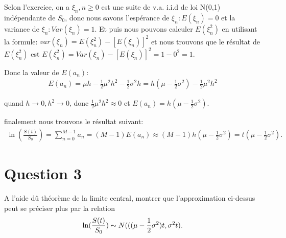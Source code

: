 \documentclass[a4paper,10pt]{report}
\begin{document}
\par Selon l'exercice, on a $\xi_{n}, n \geq 0$ est une suite de v.a. i.i.d de loi N(0,1) indépendante de $S_{0}$, donc nous savons l'espérance de $\xi_{n}: E(\xi_{n}) = 0$ et la variance de $\xi_{n}: Var(\xi_{n}) = 1$.  Et puis nous pouvons calculer $E(\xi_{n}^{2})$ en utilisant la formule: $var(\xi_{n}) = E(\xi_{n}^{2}) - [E(\xi_{n})]^{2}$ et nous trouvons que le résultat de $E(\xi_{n}^{2})$ est $E(\xi_{n}^{2}) = Var(\xi_{n}) - [E(\xi_{n})]^{2} = 1 - 0^{2} = 1$.
\par Donc la valeur de $E(a_{n})$:
\begin{align*}
	E(a_{n}) = \mu h -\frac{1}{2} \mu^{2} h^{2} -\frac{1}{2} \sigma^{2} h = h(\mu - \frac{1}{2} \sigma^{2}) -\frac{1}{2} \mu^{2} h^{2}
\end{align*}
\par quand $h \rightarrow 0, h^{2} \rightarrow 0$, donc $\frac{1}{2} \mu^{2} h^{2} \approx 0$ et $E(a_{n}) = h(\mu - \frac{1}{2} \sigma^{2})$.
\par finalement nous trouvons le résultat suivant:
\begin{align*}
		\ln (\frac{S(t)}{S_{0}}) = \sum_{n=0}^{M-1} a_{n} = (M-1) E(a_{n}) \approx (M - 1) h(\mu - \frac{1}{2} \sigma^{2}) = t(\mu - \frac{1}{2} \sigma^{2}).
\end{align*}

\section{Question 3}
\par A l'aide dû théorème de la limite central, montrer que l'approximation ci-dessus peut se préciser plus par la relation
\begin{align*}
	\ln (\frac{S(t)}{S_{0}}) \thicksim N(((\mu - \frac{1}{2} \sigma^{2})t, \sigma^{2}t).
\end{align*}
\end{document}
